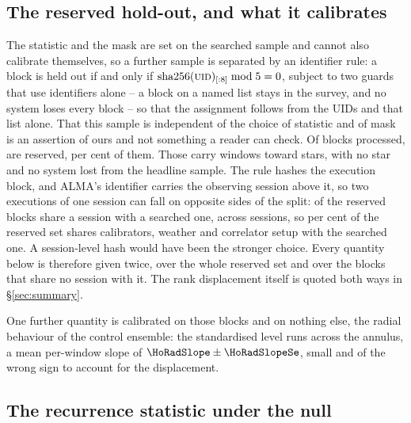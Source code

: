 \subsection{The reserved hold-out, and what it calibrates}
\label{sec:heldout}

The statistic and the mask are set on the searched sample and cannot also
calibrate themselves, so a further sample is separated by an identifier rule:
a block is held out if and only if
$\mathrm{sha256}(\textsc{uid})_{[:8]} \bmod 5 = 0$, subject to two guards that
use identifiers alone -- a block on a named list stays in the
survey, and no system loses every block -- so that the assignment follows
from the UIDs and that list alone. That this sample is independent of the
choice of statistic and of mask is an assertion of ours and not something a
reader can check. Of
\NEbProcessedAll{} blocks processed, \NEbHeldOut{} are reserved, \HoPctHeld{}
per cent of them. Those carry \HoWin{} windows toward \HoStars{} stars, with
no star and no system lost from the headline sample. The rule hashes the
execution block, and ALMA's
identifier carries the observing session above it, so two executions of one session can fall on opposite sides of the split:
\BkSessHoBlocks{} of the
\NEbHeldOut{} reserved blocks share a session with a searched one, across
\BkSessShared{} sessions, so \HsSharePct{} per cent of the reserved set shares
calibrators, weather and correlator setup with the searched one. A
session-level hash would have been the stronger choice.
Every quantity below is therefore given twice, over the whole reserved set and
over the \HsIndBlocks{} blocks that share no session with it. The rank
displacement itself is quoted both ways in \S\ref{sec:summary}.

One further quantity is calibrated on those blocks and on nothing else, the
radial behaviour of the control ensemble: the standardised level
runs \HoRadBins{} across the annulus, a mean per-window slope of
$\HoRadSlope\pm\HoRadSlopeSe$, small and of the wrong sign to account for the
displacement.

\subsection{The recurrence statistic under the null}
\label{sec:nullscatter}

